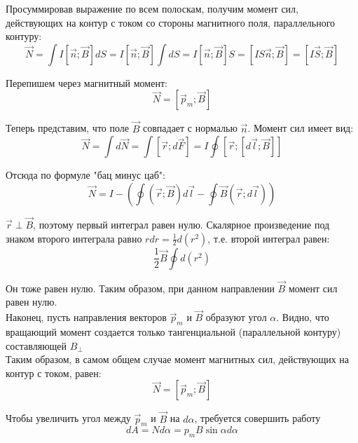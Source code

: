 \documentclass{article}
\begin{document}
	Просуммировав выражение по всем полоскам, получим момент сил, действующих на контур с током со стороны магнитного поля, параллельного контуру:
	\begin{equation}
		\vec N = \int I[\vec n;\vec B]dS = I[\vec n;\vec B]\int dS = I[\vec n;\vec B]S = [IS\vec n; \vec B] = [I\vec S;\vec B]
	\end{equation}

	Перепишем через магнитный момент:
	\begin{equation}
		\vec N = [\vec p_m;\vec B]
	\end{equation}

	Теперь представим, что поле $\vec B$ совпадает с нормалью $\vec n$. Момент сил имеет вид:
	\begin{equation}
		\vec N = \int d\vec N = \int [\vec r;d\vec F] = I\oint[\vec r;[d\vec l;\vec B]]
	\end{equation}

	Отсюда по формуле "бац минус цаб":
	\begin{equation}
		\vec N = I - (\oint (\vec r;\vec B)d\vec l - \oint \vec B(\vec r;d\vec l))
	\end{equation}

	$\vec r\perp \vec B$, поэтому первый интеграл равен нулю. Скалярное произведение под знаком второго интеграла равно $rdr = \frac{1}{2}d(r^2)$, т.е. второй интеграл равен:
	\begin{equation}
		\frac{1}{2}\vec B \oint d(r^2)
	\end{equation}

	Он тоже равен нулю. Таким образом, при данном направлении $\vec B$ момент сил равен нулю.\\

	Наконец, пусть направления векторов $\vec p_m$ и $\vec B$ образуют угол $\alpha$. Видно, что вращающий момент создается только тангенциальной (параллельной контуру) составляющей $B_\perp$\\

	Таким образом, в самом общем случае момент магнитных сил, действующих на контур с током, равен:
	\begin{equation}
		\vec N = [\vec p_m;\vec B]
	\end{equation}

	Чтобы увеличить угол между $\vec p_m$ и $\vec B$ на $d\alpha$, требуется совершить работу
	\begin{equation}
		dA = Nd\alpha = p_m B \sin\alpha d\alpha
	\end{equation}
\end{document}
